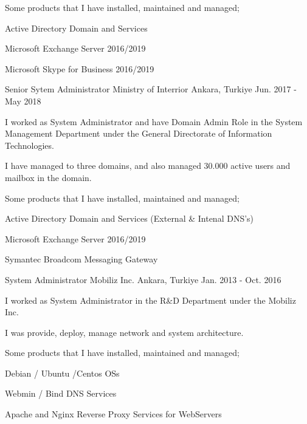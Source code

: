 \begin{cventries}
{\begin{cvitems}
        \item {Some products that I have installed, maintained and managed;}
        \item {Active Directory Domain and Services}
        \item {Microsoft Exchange Server 2016/2019}
        \item {Microsoft Skype for Business 2016/2019}
      \end{cvitems}
    }
  \cventry
    {Senior Sytem Administrator} %
    {Ministry of Interrior} %
    {Ankara, Turkiye} %
    {Jun. 2017 - May 2018} %
    {
      \begin{cvitems} %
        \item {I worked as System Administrator and have Domain Admin Role in the System Management Department under the General Directorate of Information Technologies.}
        \item {I have managed to three domains, and also managed 30.000 active users and mailbox in the domain.}
        \item {Some products that I have installed, maintained and managed;}
        \item {Active Directory Domain and Services (External \& Intenal DNS's)}
        \item {Microsoft Exchange Server 2016/2019}
        \item {Symantec Broadcom Messaging Gateway}
      \end{cvitems}
    }
  \cventry
    {System Administrator} %
    {Mobiliz Inc.} %
    {Ankara, Turkiye} %
    {Jan. 2013 - Oct. 2016} %
    {
      \begin{cvitems} %
        \item {I worked as System Administrator in the R\&D Department under the Mobiliz Inc.}
        \item {I was provide, deploy, manage network and system architecture.}
        \item {Some products that I have installed, maintained and managed;}
        \item {Debian / Ubuntu /Centos OSs}
        \item {Webmin / Bind DNS Services}
        \item {Apache and Nginx Reverse Proxy Services for WebServers}

\end{cvitems}}
\end{cventries}
